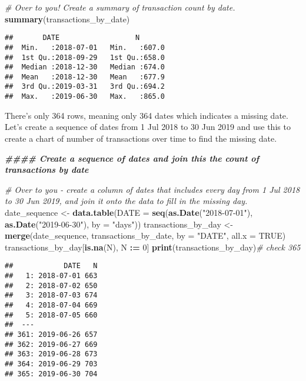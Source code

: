 \documentclass[
]{article}
\newenvironment{Shaded}{\begin{snugshade}}{\end{snugshade}}
\newcommand{\AttributeTok}[1]{\textcolor[rgb]{0.13,0.29,0.53}{#1}}
\newcommand{\CommentTok}[1]{\textcolor[rgb]{0.56,0.35,0.01}{\textit{#1}}}
\newcommand{\ConstantTok}[1]{\textcolor[rgb]{0.56,0.35,0.01}{#1}}
\newcommand{\DecValTok}[1]{\textcolor[rgb]{0.00,0.00,0.81}{#1}}
\newcommand{\DocumentationTok}[1]{\textcolor[rgb]{0.56,0.35,0.01}{\textbf{\textit{#1}}}}
\newcommand{\FunctionTok}[1]{\textcolor[rgb]{0.13,0.29,0.53}{\textbf{#1}}}
\newcommand{\NormalTok}[1]{#1}
\newcommand{\OtherTok}[1]{\textcolor[rgb]{0.56,0.35,0.01}{#1}}
\newcommand{\SpecialCharTok}[1]{\textcolor[rgb]{0.81,0.36,0.00}{\textbf{#1}}}
\newcommand{\StringTok}[1]{\textcolor[rgb]{0.31,0.60,0.02}{#1}}
\begin{document}
\begin{Shaded}
\begin{Highlighting}[]
\CommentTok{\# Over to you! Create a summary of transaction count by date.}
\FunctionTok{summary}\NormalTok{(transactions\_by\_date)}
\end{Highlighting}
\end{Shaded}

\begin{verbatim}
##       DATE                  N        
##  Min.   :2018-07-01   Min.   :607.0  
##  1st Qu.:2018-09-29   1st Qu.:658.0  
##  Median :2018-12-30   Median :674.0  
##  Mean   :2018-12-30   Mean   :677.9  
##  3rd Qu.:2019-03-31   3rd Qu.:694.2  
##  Max.   :2019-06-30   Max.   :865.0
\end{verbatim}

There's only 364 rows, meaning only 364 dates which indicates a missing
date. Let's create a sequence of dates from 1 Jul 2018 to 30 Jun 2019
and use this to create a chart of number of transactions over time to
find the missing date.

\begin{Shaded}
\begin{Highlighting}[]
\DocumentationTok{\#\#\#\# Create a sequence of dates and join this the count of transactions by date}

\CommentTok{\# Over to you {-} create a column of dates that includes every day from 1 Jul 2018 to 30 Jun 2019, and join it onto the data to fill in the missing day.}
\NormalTok{date\_sequence }\OtherTok{\textless{}{-}} \FunctionTok{data.table}\NormalTok{(}\AttributeTok{DATE =} \FunctionTok{seq}\NormalTok{(}\FunctionTok{as.Date}\NormalTok{(}\StringTok{"2018{-}07{-}01"}\NormalTok{), }\FunctionTok{as.Date}\NormalTok{(}\StringTok{"2019{-}06{-}30"}\NormalTok{), }\AttributeTok{by =} \StringTok{"days"}\NormalTok{))}
\NormalTok{transactions\_by\_day }\OtherTok{\textless{}{-}} \FunctionTok{merge}\NormalTok{(date\_sequence, transactions\_by\_date, }\AttributeTok{by =} \StringTok{"DATE"}\NormalTok{, }\AttributeTok{all.x =} \ConstantTok{TRUE}\NormalTok{)}
\NormalTok{transactions\_by\_day[}\FunctionTok{is.na}\NormalTok{(N), N }\SpecialCharTok{:=} \DecValTok{0}\NormalTok{]}
\FunctionTok{print}\NormalTok{(transactions\_by\_day)}\CommentTok{\# check 365}
\end{Highlighting}
\end{Shaded}

\begin{verbatim}
##            DATE   N
##   1: 2018-07-01 663
##   2: 2018-07-02 650
##   3: 2018-07-03 674
##   4: 2018-07-04 669
##   5: 2018-07-05 660
##  ---               
## 361: 2019-06-26 657
## 362: 2019-06-27 669
## 363: 2019-06-28 673
## 364: 2019-06-29 703
## 365: 2019-06-30 704
\end{verbatim}
\end{document}
